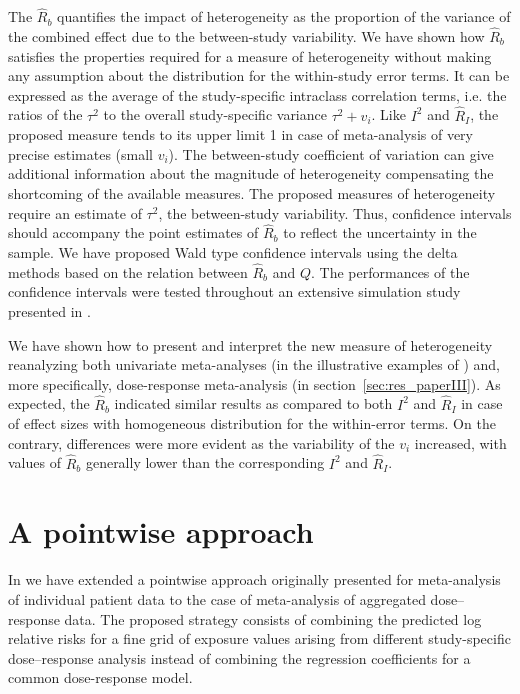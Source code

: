 \documentclass[11pt,a4paper,twoside,openany]{book}\usepackage{knitr}
\begin{document}
{The $\hat R_b$ quantifies the impact of heterogeneity as the proportion of the variance of the combined effect due to the between-study variability. We have shown how $\hat R_b$ satisfies the properties required for a measure of heterogeneity without making any assumption about the distribution for the within-study error terms. It can be expressed as the average of the study-specific intraclass correlation terms, i.e. the ratios of the $\tau^2$ to the overall study-specific variance $\tau^2 + v_i$. Like $I^2$ and $\hat R_I$, the proposed measure tends to its upper limit 1 in case of meta-analysis of very precise estimates (small $v_i$). The between-study coefficient of variation can give additional information about the magnitude of heterogeneity compensating the shortcoming of the available measures.
The proposed measures of heterogeneity require an estimate of $\tau^2$, the between-study variability. Thus, confidence intervals should accompany the point estimates of $\hat R_b$ to reflect the uncertainty in the sample. We have proposed Wald type confidence intervals using the delta methods based on the relation between $\hat R_b$ and $Q$. The performances of the confidence intervals were tested throughout an extensive simulation study presented in .

We have shown how to present and interpret the new measure of heterogeneity reanalyzing both univariate meta-analyses (in the illustrative examples of ) and, more specifically, dose-response meta-analysis (in section~\ref{sec:res_paperIII}). As expected, the $\hat R_b$ indicated similar results as compared to both $I^2$ and $\hat R_I$ in case of effect sizes with homogeneous distribution for the within-error terms. On the contrary, differences were more evident as the variability of the $v_i$ increased, with values of $\hat R_b$ generally lower than the corresponding $I^2$ and $\hat R_I$.


\section{A pointwise approach}

In  we have extended a pointwise approach originally presented for meta-analysis of individual patient data to the case of meta-analysis of aggregated dose--response data.  The proposed strategy consists of combining the predicted log relative risks for a fine grid of exposure values arising from different study-specific dose--response analysis instead of combining the regression coefficients for a common dose-response model.

}
\end{document}
